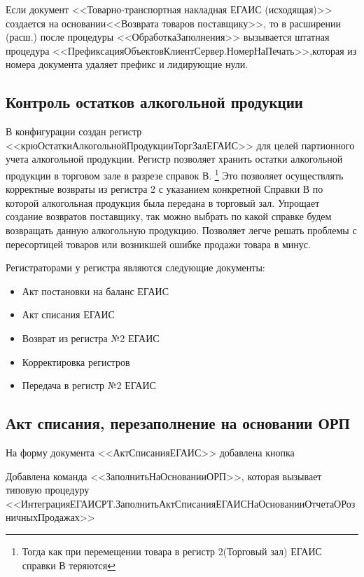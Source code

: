 Если документ <<Товарно-транспортная накладная ЕГАИС (исходящая)>> создается на основании<<Возврата товаров поставщику>>, то в расширении (расш.)
 после процедуры <<ОбработкаЗаполнения>> вызывается штатная процедура <<ПрефиксацияОбъектовКлиентСервер.НомерНаПечать>>,которая из номера документа удаляет префикс и лидирующие нули.

\subsection{Контроль остатков алкогольной продукции}\label{1009}	 
В конфигурации создан регистр <<крюОстаткиАлкогольнойПродукцииТоргЗалЕГАИС>> для целей партионного учета алкогольной продукции. Регистр позволяет хранить остатки алкогольной продукции в торговом зале в разрезе справок В. \footnote{Тогда как при перемещении товара в регистр 2(Торговый зал) ЕГАИС справки В теряются} Это позволяет осуществлять корректные возвраты из регистра 2 с указанием конкретной Справки В по которой алкогольная продукция была передана в торговый зал. Упрощает создание возвратов поставщику, так можно выбрать по какой справке будем возвращать данную алкогольную продукцию. Позволяет легче решать проблемы с пересортицей товаров или возникшей ошибке продажи товара в минус. \par
\vspace{\baselineskip}\par
\vspace{\baselineskip}\par
Регистраторами у регистра являются следующие документы:
\begin{itemize}
	\item Акт постановки на баланс ЕГАИС
	\item Акт списания ЕГАИС
	\item Возврат из регистра №2 ЕГАИС
	\item Корректировка регистров
	\item Передача в регистр №2 ЕГАИС
\end{itemize}

\subsection{Акт списания, перезаполнение на основании ОРП}\label{1010}	 
На форму документа <<АктСписанияЕГАИС>>  добавлена кнопка  \par
Добавлена команда <<ЗаполнитьНаОснованииОРП>>, которая вызывает типовую процедуру <<ИнтеграцияЕГАИСРТ.ЗаполнитьАктСписанияЕГАИСНаОснованииОтчетаОРозничныхПродажах>>



